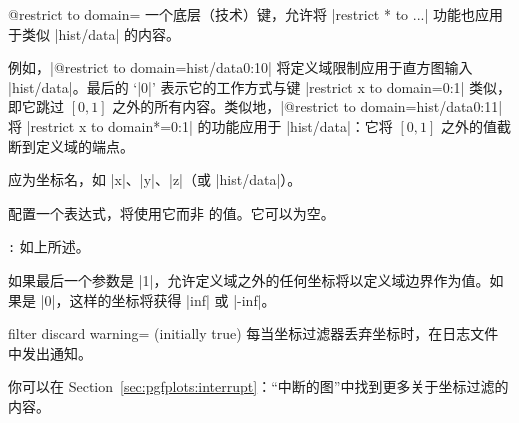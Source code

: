 \begin{pgfplotskey}{%
    @restrict to domain=%
}
    一个底层（技术）键，允许将 |restrict * to ...| 功能也应用于类似 |hist/data| 的内容。

    例如，|@restrict to domain={hist/data}{}{0:1}{0}| 将定义域限制应用于直方图输入 |hist/data|。最后的 `|0|' 表示它的工作方式与键 |restrict x to domain=0:1| 类似，即它跳过 $[0,1]$ 之外的所有内容。类似地，|@restrict to domain={hist/data}{}{0:1}{1}| 将 |restrict x to domain*=0:1| 的功能应用于 |hist/data|：它将 $[0,1]$ 之外的值截断到定义域的端点。

     应为坐标名，如 |x|、|y|、|z|（或 |hist/data|）。

     配置一个表达式，将使用它而非  的值。它可以为空。

    \texttt{:} 如上所述。

    如果最后一个参数是 |1|，允许定义域之外的任何坐标将以定义域边界作为值。如果是 |0|，这样的坐标将获得 |inf| 或 |-inf|。
\end{pgfplotskey}

\begin{pgfplotskey}{filter discard warning= (initially true)}
    每当坐标过滤器丢弃坐标时，在日志文件中发出通知。
\end{pgfplotskey}

你可以在 Section~\ref{sec:pgfplots:interrupt}：“中断的图”中找到更多关于坐标过滤的内容。
